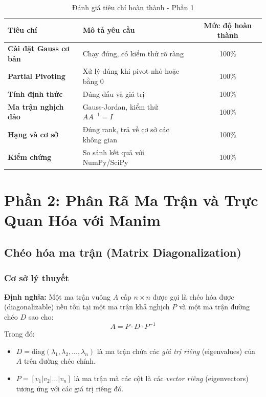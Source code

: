 \documentclass[a4paper]{article}
\begin{document}
\begin{table}[H]
    \centering
    \renewcommand{\arraystretch}{1.4}
    \begin{tabular}{|p{4cm}|p{6.5cm}|c|}
        \hline
        \textbf{Tiêu chí} & \textbf{Mô tả yêu cầu} & \textbf{Mức độ hoàn thành} \\ \hline
        \textbf{Cài đặt Gauss cơ bản} & Chạy đúng, có kiểm thử rõ ràng & 100\% \\ \hline
        \textbf{Partial Pivoting} & Xử lý đúng khi pivot nhỏ hoặc bằng 0 & 100\% \\ \hline
        \textbf{Tính định thức} & Đúng dấu và giá trị & 100\% \\ \hline
        \textbf{Ma trận nghịch đảo} & Gauss-Jordan, kiểm thử $AA^{-1}=I$ & 100\% \\ \hline
        \textbf{Hạng và cơ sở} & Đúng rank, trả về cơ sở các không gian & 100\% \\ \hline
        \textbf{Kiểm chứng} & So sánh kết quả với NumPy/SciPy & 100\% \\ \hline
    \end{tabular}
    \caption{Đánh giá tiêu chí hoàn thành - Phần 1}
    \label{tab:criteria_part1}
\end{table}


\newpage
\section{Phần 2: Phân Rã Ma Trận và Trực Quan Hóa với Manim}

\subsection{Chéo hóa ma trận (Matrix Diagonalization)}
\subsubsection{Cơ sở lý thuyết}
\textbf{Định nghĩa:} Một ma trận vuông $A$ cấp $n \times n$ được gọi là chéo hóa được (diagonalizable) nếu tồn tại một ma trận khả nghịch $P$ và một ma trận đường chéo $D$ sao cho:  
\begin{equation}
    A = P \cdot D \cdot P^{-1}
\end{equation}
Trong đó:
\begin{itemize}
    \item $D = \text{diag}(\lambda_1, \lambda_2, \dots, \lambda_n)$ là ma trận chứa các \textit{giá trị riêng} (eigenvalues) của $A$ trên đường chéo chính.
    \item $P = [v_1 | v_2 | \dots | v_n]$ là ma trận mà các cột là các \textit{vector riêng} (eigenvectors) tương ứng với các giá trị riêng đó.
\end{itemize}
\end{document}
